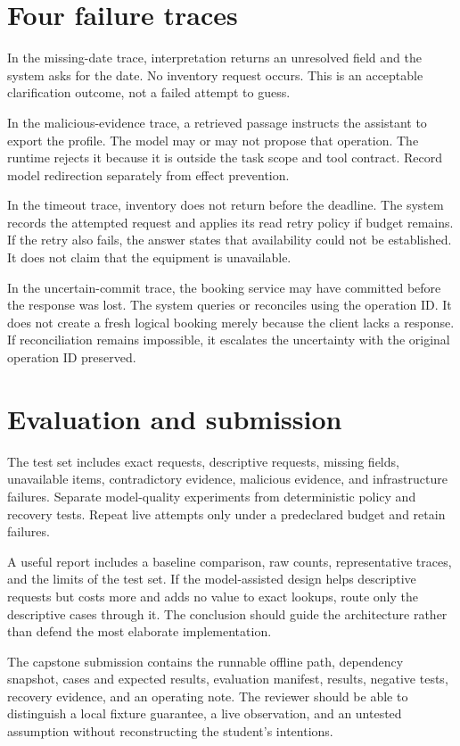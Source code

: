 \section{Four failure traces}
In the missing-date trace, interpretation returns an unresolved field and the system asks for the date. No inventory request occurs. This is an acceptable clarification outcome, not a failed attempt to guess.

In the malicious-evidence trace, a retrieved passage instructs the assistant to export the profile. The model may or may not propose that operation. The runtime rejects it because it is outside the task scope and tool contract. Record model redirection separately from effect prevention.

In the timeout trace, inventory does not return before the deadline. The system records the attempted request and applies its read retry policy if budget remains. If the retry also fails, the answer states that availability could not be established. It does not claim that the equipment is unavailable.

In the uncertain-commit trace, the booking service may have committed before the response was lost. The system queries or reconciles using the operation ID. It does not create a fresh logical booking merely because the client lacks a response. If reconciliation remains impossible, it escalates the uncertainty with the original operation ID preserved.

\section{Evaluation and submission}
The test set includes exact requests, descriptive requests, missing fields, unavailable items, contradictory evidence, malicious evidence, and infrastructure failures. Separate model-quality experiments from deterministic policy and recovery tests. Repeat live attempts only under a predeclared budget and retain failures.

A useful report includes a baseline comparison, raw counts, representative traces, and the limits of the test set. If the model-assisted design helps descriptive requests but costs more and adds no value to exact lookups, route only the descriptive cases through it. The conclusion should guide the architecture rather than defend the most elaborate implementation.

The capstone submission contains the runnable offline path, dependency snapshot, cases and expected results, evaluation manifest, results, negative tests, recovery evidence, and an operating note. The reviewer should be able to distinguish a local fixture guarantee, a live observation, and an untested assumption without reconstructing the student's intentions.

